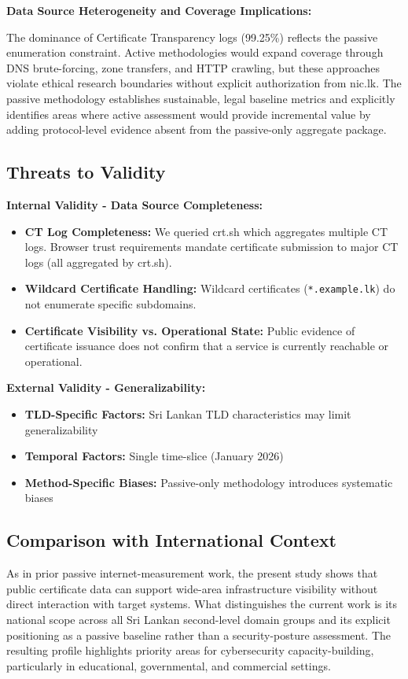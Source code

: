 \documentclass[preprint,review,12pt]{elsarticle}
\begin{document}
\textbf{Data Source Heterogeneity and Coverage Implications:}

The dominance of Certificate Transparency logs (99.25\%) reflects the passive enumeration constraint. Active methodologies would expand coverage through DNS brute-forcing, zone transfers, and HTTP crawling, but these approaches violate ethical research boundaries without explicit authorization from nic.lk. The passive methodology establishes sustainable, legal baseline metrics and explicitly identifies areas where active assessment would provide incremental value by adding protocol-level evidence absent from the passive-only aggregate package.

\subsection{Threats to Validity}

\textbf{Internal Validity - Data Source Completeness:}
\begin{itemize}
    \item \textbf{CT Log Completeness:} We queried crt.sh which aggregates multiple CT logs. Browser trust requirements mandate certificate submission to major CT logs (all aggregated by crt.sh).
    \item \textbf{Wildcard Certificate Handling:} Wildcard certificates (\texttt{*.example.lk}) do not enumerate specific subdomains.
    \item \textbf{Certificate Visibility vs. Operational State:} Public evidence of certificate issuance does not confirm that a service is currently reachable or operational.
\end{itemize}

\textbf{External Validity - Generalizability:}
\begin{itemize}
    \item \textbf{TLD-Specific Factors:} Sri Lankan TLD characteristics may limit generalizability
    \item \textbf{Temporal Factors:} Single time-slice (January 2026)
    \item \textbf{Method-Specific Biases:} Passive-only methodology introduces systematic biases
\end{itemize}

\subsection{Comparison with International Context}

As in prior passive internet-measurement work, the present study shows that public certificate data can support wide-area infrastructure visibility without direct interaction with target systems. What distinguishes the current work is its national scope across all Sri Lankan second-level domain groups and its explicit positioning as a passive baseline rather than a security-posture assessment. The resulting profile highlights priority areas for cybersecurity capacity-building, particularly in educational, governmental, and commercial settings.
\end{document}
